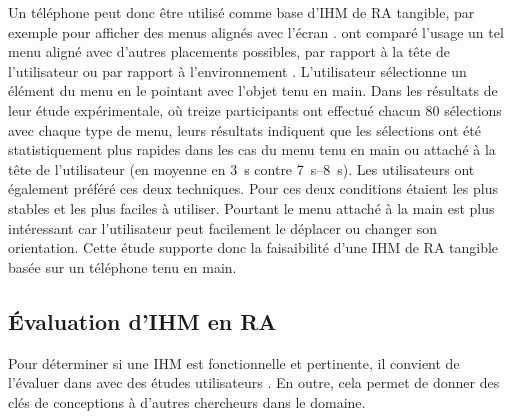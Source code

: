 
Un téléphone peut donc être utilisé comme base d'IHM de RA tangible, par exemple pour afficher des menus alignés avec l'écran . \cite{White2009} ont comparé l'usage un tel menu aligné avec d'autres placements possibles, par rapport à la tête de l'utilisateur ou par rapport à l'environnement . L'utilisateur sélectionne un élément du menu en le pointant avec l'objet tenu en main. Dans les résultats de leur étude expérimentale, où treize participants ont effectué chacun 80 sélections avec chaque type de menu, leurs résultats indiquent que les sélections ont été statistiquement plus rapides dans les cas du menu tenu en main ou attaché à la tête de l'utilisateur (en moyenne en \SI{3}{\s} contre \SIrange{7}{8}{\s}). Les utilisateurs ont également préféré ces deux techniques. Pour \citeauthor{White2009} ces deux conditions étaient les plus stables et les plus faciles à utiliser. Pourtant le menu attaché à la main est plus intéressant car l'utilisateur peut facilement le déplacer ou changer son orientation. Cette étude supporte donc la faisaibilité d'une IHM de RA tangible basée sur un téléphone tenu en main.

\subsection{Évaluation d'IHM en RA}
\label{subsec:litterature_ar_hci_evaluation}
Pour déterminer si une IHM est fonctionnelle et pertinente, il convient de l'évaluer dans avec des études utilisateurs \cite[p. 189]{Billinghurst2015}. En outre, cela permet de donner des clés de conceptions à d'autres chercheurs dans le domaine.

